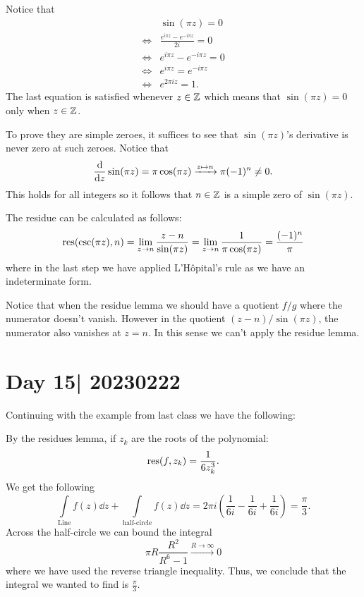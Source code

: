 \documentclass[12pt]{memoir}
\begin{document}
\begin{ptcbr}
    Notice that 
    \begin{align*}
        &\sin(\pi z)=0\\
        \iff&\frac{e^{i\pi z}-e^{-i\pi z}}{2i}=0\\
        \iff&e^{i\pi z}-e^{-i\pi z}=0\\
        \iff&e^{i\pi z}=e^{-i\pi z}\\
        \iff&e^{2\pi i z}=1.
    \end{align*}
    The last equation is satisfied whenever $z\in\mathbb{Z}$ which means that $\sin(\pi z)=0$ only when $z\in\mathbb{Z}$.\par 
    To prove they are simple zeroes, it suffices to see that $\sin(\pi z)$'s derivative is never zero at such zeroes. Notice that 
    $$\dv{z}\sin(\pi z)=\pi\cos(\pi z)\xrightarrow[]{z\mapsto n}\pi (-1)^n\neq 0.$$
    This holds for all integers so it follows that $n\in\mathbb{Z}$ is a simple zero of $\sin(\pi z)$.\par 
    The residue can be calculated as follows: 
    $$\operatorname*{res}(\csc(\pi z),n)=\lim_{z\to n}\frac{z-n}{\sin(\pi z)}=\lim_{z\to n}\frac{1}{\pi\cos(\pi z)}=\frac{(-1)^n}{\pi}$$
    where in the last step we have applied L'H\^{o}pital's rule as we have an indeterminate form.\par 
    Notice that when the residue lemma we should have a quotient $f/g$ where the numerator doesn't vanish. However in the quotient $(z-n)/\sin(\pi z)$, the numerator also vanishes at $z=n$. In this sense we can't apply the residue lemma. 
\end{ptcbr}
\section{Day 15| 20230222}

Continuing with the example from last class we have the following:

\begin{ptcb}
    By the residues lemma, if $z_k$ are the roots of the polynomial:
    $$\operatorname*{res}(f,z_k)=\frac{1}{6z_k^3}.$$
    We get the following 
    $$\int\limits_{\text{Line}}f(z)\dd z+\int\limits_{\text{half-circle}}f(z)\dd z=2\pi i\left(\frac{1}{6i}-\frac{1}{6i}+\frac{1}{6i}\right)=\frac{\pi}{3}.$$
    Across the half-circle we can bound the integral 
    $$\pi R\frac{R^2}{R^6-1}\xrightarrow[]{R\to\infty
    }0$$
    where we have used the reverse triangle inequality. Thus, we conclude that the integral we wanted to find is $\frac{\pi}{3}$.
\end{ptcb}
\end{document}
